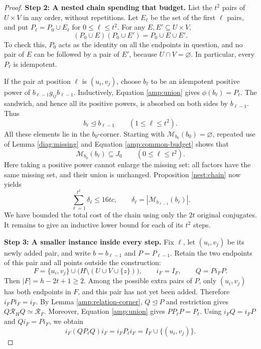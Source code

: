 \begin{proof}
\medskip
\noindent\textbf{Step 2: A nested chain spending that budget.}
List the $t^2$ pairs of $U\times V$ in any order, without
repetitions.  Let $E_\ell$ be the set of the first $\ell$
pairs, and put $P_\ell=P_0\cup E_\ell$ for
$0\leq\ell\leq t^2$.  For any $E,E'\subseteq U\times V$,
\begin{equation}
 (P_0\cup E)(P_0\cup E')=P_0\cup E\cup E'.
 \label{amp:union}
\end{equation}
To check this, $P_0$ acts as the identity on all the endpoints
in question, and no pair of $E$ can be followed by a pair of
$E'$, because $U\cap V=\varnothing$.
In particular, every $P_\ell$ is idempotent.

If the pair at position $\ell$ is $(u_i,v_j)$, choose
$b_\ell$ to be an idempotent positive power of
$b_{\ell-1}g_{ij}b_{\ell-1}$.
Inductively, Equation \eqref{amp:union} gives
$\phi(b_\ell)=P_\ell$.
The sandwich, and hence all its positive powers, is absorbed
on both sides by $b_{\ell-1}$.  Thus
\[
 b_\ell\trianglelefteq b_{\ell-1}
 \qquad(1\leq\ell\leq t^2).
\]
All these elements lie in the $b_0$-corner.  Starting with
$\mathcal M_{b_0}(b_0)=\varnothing$, repeated use of Lemma
\ref{diag:missing} and Equation \eqref{amp:common-budget}
shows that
\[
 \mathcal M_{b_0}(b_\ell)\subseteq J_0
 \qquad(0\leq\ell\leq t^2).
\]
Here taking a positive power cannot enlarge the missing set:
all factors have the same missing set, and their union is
unchanged.  Proposition \ref{nest:chain} now yields
\begin{equation}
 \sum_{\ell=1}^{t^2}\delta_\ell\leq16tc,
 \qquad
 \delta_\ell=|\mathcal M_{b_{\ell-1}}(b_\ell)|.
 \label{amp:total-cost}
\end{equation}
We have bounded the total cost of the chain using only the
$2t$ original conjugates.  It remains to give an inductive
lower bound for each of its $t^2$ steps.

\medskip
\noindent\textbf{Step 3: A smaller instance inside every step.}
Fix $\ell$, let $(u_i,v_j)$ be its newly added pair, and
write $b=b_{\ell-1}$ and $P=P_{\ell-1}$.  Retain the two
endpoints of this pair and all points outside the construction:
\[
 F=\{u_i,v_j\}\cup
       \bigl(H\setminus(U\cup V\cup\{z\})\bigr),
 \qquad i_F=I_F,\qquad Q=Pi_FP.
\]
Then $|F|=h-2t+1\geq2$.  Among the possible extra pairs
of $P$, only $(u_i,v_j)$ has both endpoints in $F$, and this
pair has not yet been added.  Therefore
$i_FPi_F=i_F$.  By Lemma \ref{amp:relation-corner},
$Q\trianglelefteq P$ and restriction gives
$Q\mathcal R_HQ\simeq\mathcal R_F$.
Moreover, Equation \eqref{amp:union} gives
$PP_\ell P=P_\ell$.  Using $i_FQ=i_FP$ and
$Qi_F=Pi_F$, we obtain
\begin{equation}
 i_F(QP_\ell Q)i_F
 =i_FP_\ell i_F
 =I_F\cup\{(u_i,v_j)\}.
 \label{amp:compressed-pair}
\end{equation}


\end{proof}
